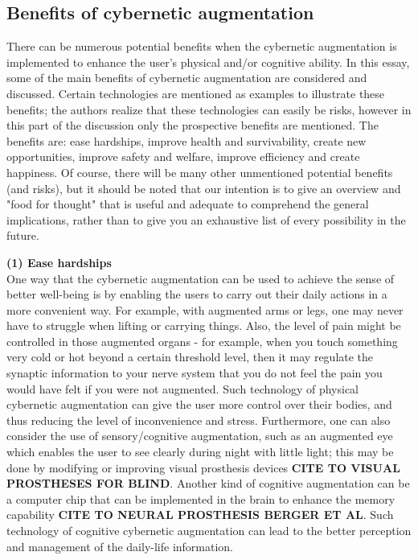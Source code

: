 \subsection{Benefits of cybernetic augmentation}

There can be numerous potential benefits when the cybernetic augmentation is implemented to enhance the user's physical and/or cognitive ability. In this essay, some of the main benefits of cybernetic augmentation are considered and discussed. Certain technologies are mentioned as examples to illustrate these benefits; the authors realize that these technologies can easily be risks, however in this part of the discussion only the prospective benefits are mentioned. The benefits are: ease hardships, improve health and survivability, create new opportunities, improve safety and welfare, improve efficiency and create happiness. Of course, there will be many other unmentioned potential benefits (and risks), but it should be noted that our intention is to give an overview and "food for thought" that is useful and adequate to comprehend the general implications, rather than to give you an exhaustive list of every possibility in the future. 

{\bf (1) Ease hardships} \\ 
One way that the cybernetic augmentation can be used to achieve the sense of better well-being is by enabling the users to carry out their daily actions in a more convenient way. For example, with augmented arms or legs, one may never have to struggle when lifting or carrying things. Also, the level of pain might be controlled in those augmented organs - for example, when you touch something very cold or hot beyond a certain threshold level, then it may regulate the synaptic information to your nerve system that you do not feel the pain you would have felt if you were not augmented. Such technology of physical cybernetic augmentation can give the user more control over their bodies, and thus reducing the level of inconvenience and stress. Furthermore, one can also consider the use of sensory/cognitive augmentation, such as an augmented eye which enables the user to see clearly during night with little light; this may be done by modifying or improving visual prosthesis devices {\bf CITE TO VISUAL PROSTHESES FOR BLIND}. Another kind of cognitive augmentation can be a computer chip that can be implemented in the brain to enhance the memory capability {\bf CITE TO NEURAL PROSTHESIS BERGER ET AL}. Such technology of cognitive cybernetic augmentation can lead to the better perception and management of the daily-life information.

